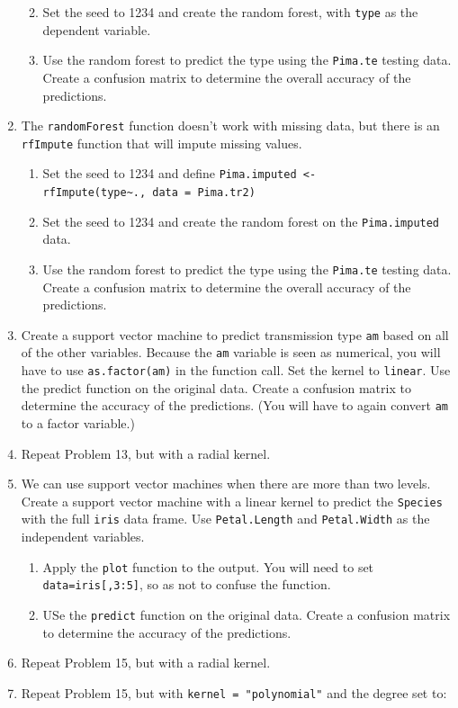 \documentclass[
]{book}
\providecommand{\tightlist}{%
  \setlength{\itemsep}{0pt}\setlength{\parskip}{0pt}}
\theoremstyle{definition}
\theoremstyle{definition}
\theoremstyle{definition}
\theoremstyle{definition}
\theoremstyle{remark}
\begin{document}
\begin{enumerate}
  \begin{enumerate}
  \def\labelenumii{\alph{enumii}.}
  \tightlist
  \item
    Set the seed to 1234 and create the random forest, with \texttt{type} as the dependent variable.
  \item
    Use the random forest to predict the type using the \texttt{Pima.te} testing data. Create a confusion matrix to determine the overall accuracy of the predictions.
  \end{enumerate}
\item
  The \texttt{randomForest} function doesn't work with missing data, but there is an \texttt{rfImpute} function that will impute missing values.

  \begin{enumerate}
  \def\labelenumii{\alph{enumii}.}
  \tightlist
  \item
    Set the seed to 1234 and define \texttt{Pima.imputed\ \textless{}-rfImpute(type\textasciitilde{}.,\ data\ =\ Pima.tr2)}
  \item
    Set the seed to 1234 and create the random forest on the \texttt{Pima.imputed} data.
  \item
    Use the random forest to predict the type using the \texttt{Pima.te} testing data. Create a confusion matrix to determine the overall accuracy of the predictions.
  \end{enumerate}
\item
  Create a support vector machine to predict transmission type \texttt{am} based on all of the other variables. Because the \texttt{am} variable is seen as numerical, you will have to use \texttt{as.factor(am)} in the function call. Set the kernel to \texttt{linear}. Use the predict function on the original data. Create a confusion matrix to determine the accuracy of the predictions. (You will have to again convert \texttt{am} to a factor variable.)
\item
  Repeat Problem 13, but with a radial kernel.
\item
  We can use support vector machines when there are more than two levels. Create a support vector machine with a linear kernel to predict the \texttt{Species} with the full \texttt{iris} data frame. Use \texttt{Petal.Length} and \texttt{Petal.Width} as the independent variables.

  \begin{enumerate}
  \def\labelenumii{\alph{enumii}.}
  \tightlist
  \item
    Apply the \texttt{plot} function to the output. You will need to set \texttt{data=iris{[},3:5{]}}, so as not to confuse the function.
  \item
    USe the \texttt{predict} function on the original data. Create a confusion matrix to determine the accuracy of the predictions.
  \end{enumerate}
\item
  Repeat Problem 15, but with a radial kernel.
\item
  Repeat Problem 15, but with \texttt{kernel\ =\ "polynomial"} and the degree set to:


\end{enumerate}
\end{document}
